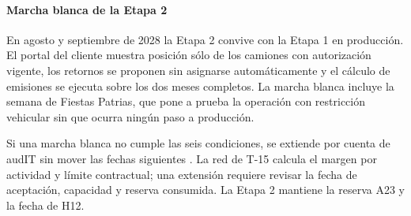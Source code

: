 \paragraph{Marcha blanca de la Etapa 2}
En agosto y septiembre de 2028 la Etapa 2 convive con la Etapa 1 en producción. El portal del cliente
muestra posición sólo de los camiones con autorización vigente, los retornos se proponen sin asignarse
automáticamente y el cálculo de emisiones se ejecuta sobre los dos meses completos. La marcha blanca
incluye la semana de Fiestas Patrias, que pone a prueba la operación con restricción vehicular sin que
ocurra ningún paso a producción.

Si una marcha blanca no cumple las seis condiciones, se extiende por cuenta de audIT sin mover las fechas
siguientes . La red de T-15 calcula el margen por actividad y límite contractual; una extensión requiere revisar la fecha de aceptación, capacidad y reserva consumida. La Etapa 2 mantiene la reserva A23 y la fecha de H12.
